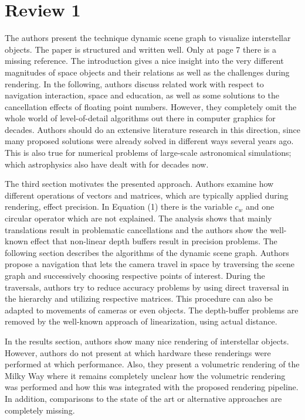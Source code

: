 \documentclass{article}
\begin{document}
\section*{Review 1}

 The authors present the technique dynamic scene graph to visualize interstellar objects.
The paper is structured and written well.
Only at page 7 there is a missing reference.
The introduction gives a nice insight into the very different magnitudes of space objects and their relations as well as the challenges during rendering.
In the following, authors discuss related work with respect to navigation interaction, space and education, as well as some solutions to the cancellation effects of floating point numbers.
However, they completely omit the whole world of level-of-detail algorithms out there in computer graphics for decades.
Authors should do an extensive literature research in this direction, since many proposed solutions were already solved in different ways several years ago.
This is also true for numerical problems of large-scale astronomical simulations; which astrophysics also have dealt with for decades now.

The third section motivates the presented approach.
Authors examine how different operations of vectors and matrices, which are typically applied during rendering, effect precision.
In Equation (1) there is the variable $c_w$ and one circular operator which are not explained.
The analysis shows that mainly translations result in problematic cancellations and the authors show the well-known effect that non-linear depth buffers result in precision problems.
The following section describes the algorithms of the dynamic scene graph.
Authors propose a navigation that lets the camera travel in space by traversing the scene graph and successively choosing respective points of interest.
During the traversals, authors try to reduce accuracy problems by using direct traversal in the hierarchy and utilizing respective matrices.
This procedure can also be adapted to movements of cameras or even objects.
The depth-buffer problems are removed by the well-known approach of linearization, using actual distance.

In the results section, authors show many nice rendering of interstellar objects.
However, authors do not present at which hardware these renderings were performed at which performance.
Also, they present a volumetric rendering of the Milky Way where it remains completely unclear how the volumetric rendering was performed and how this was integrated with the proposed rendering pipeline.
In addition, comparisons to the state of the art or alternative approaches are completely missing.
\end{document}
